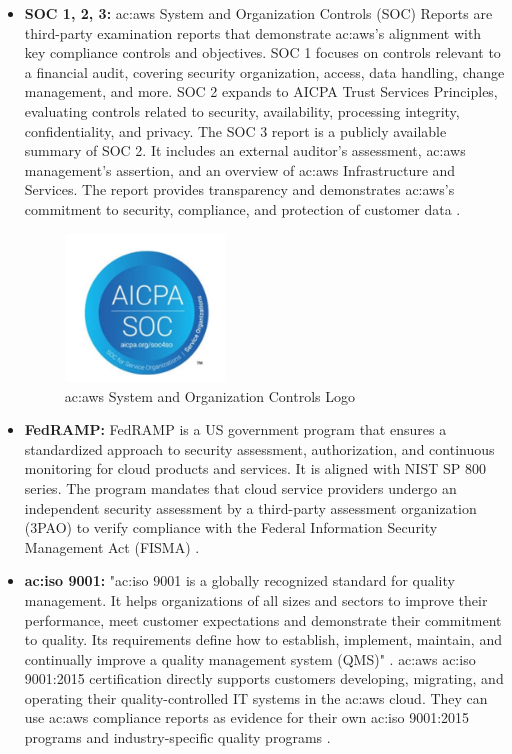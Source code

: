 \begin{itemize}
    \item \textbf{SOC 1, 2, 3: } \gls{ac:aws} System and Organization Controls (SOC) Reports are third-party examination reports that demonstrate \gls{ac:aws}'s alignment with key compliance controls and objectives. SOC 1 focuses on controls relevant to a financial audit, covering security organization, access, data handling, change management, and more. SOC 2 expands to AICPA Trust Services Principles, evaluating controls related to security, availability, processing integrity, confidentiality, and privacy. The SOC 3 report is a publicly available summary of SOC 2. It includes an external auditor's assessment, \gls{ac:aws} management's assertion, and an overview of \gls{ac:aws} Infrastructure and Services. The report provides transparency and demonstrates \gls{ac:aws}'s commitment to security, compliance, and protection of customer data \cite{AWSSOC3}.
    \begin{figure}[h]  %
        \centering
        \includegraphics[width=0.4\textwidth]{images/AWSSOC.png}  %
        \caption{\gls{ac:aws} System and Organization Controls Logo}
        \label{fig:AWSSOC}
    \end{figure}
    \item \textbf{FedRAMP:} FedRAMP is a US government program that ensures a standardized approach to security assessment, authorization, and continuous monitoring for cloud products and services. It is aligned with NIST SP 800 series. The program mandates that cloud service providers undergo an independent security assessment by a third-party assessment organization (3PAO) to verify compliance with the  Federal Information Security Management Act (FISMA) \cite{Fedramp}.
    \item \textbf{\gls{ac:iso} 9001:} "\gls{ac:iso} 9001 is a globally recognized standard for quality management. It helps organizations of all sizes and sectors to improve their performance, meet customer expectations and demonstrate their commitment to quality. Its requirements define how to establish, implement, maintain, and continually improve a quality management system (QMS)" \cite{ISO9001}. \gls{ac:aws} \gls{ac:iso} 9001:2015 certification directly supports customers developing, migrating, and operating their quality-controlled IT systems in the \gls{ac:aws} cloud. They can use \gls{ac:aws} compliance reports as evidence for their own \gls{ac:iso} 9001:2015 programs and industry-specific quality programs \cite{AWSISO9001}.

\end{itemize}
